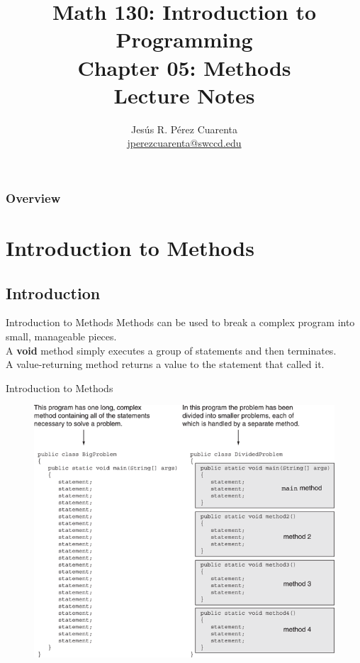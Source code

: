 \documentclass[11pt]{beamer}
\title[Chapter 05 Notes]{Math 130: Introduction to Programming \\ Chapter 05: Methods \\ Lecture Notes}
\author{Jesús R. Pérez Cuarenta \\
\href{mailto:jperezcuarenta@swccd.edu}{jperezcuarenta@swccd.edu}
}
\date{}
\begin{document}
\begin{frame}
  \maketitle
\end{frame}

\begin{frame}
\frametitle{Overview}
    \tableofcontents
\end{frame}

\section{Introduction to Methods}
\subsection{Introduction}
\begin{frame}{Introduction to Methods}
    Methods can be used to break a complex program into small, manageable pieces. \\ 
    \vspace{1em} 
    A \textbf{void} method simply executes a group of statements and then terminates. \\ 
    \vspace{1em} 
    A value-returning method returns a value to the statement that called it.        
\end{frame}

\begin{frame}{Introduction to Methods}
    \noindent 
    \begin{figure}[H]
    \centering
    \includegraphics[scale=0.7]{Images/chapter05_motivation.png}
    \end{figure}
\end{frame}
\end{document}

